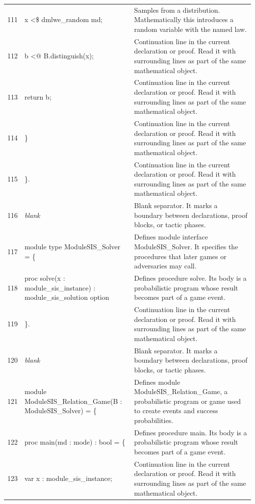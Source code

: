 \documentclass[10pt]{article}
\begin{document}
\begin{longtable}{r L{0.53\textwidth} L{0.37\textwidth}}
111 & {\ttfamily\scriptsize     x <\$ dmlwe\_random md;} & Samples from a distribution.  Mathematically this introduces a random variable with the named law. \\
112 & {\ttfamily\scriptsize     b <@ B.distinguish(x);} & Continuation line in the current declaration or proof.  Read it with surrounding lines as part of the same mathematical object. \\
113 & {\ttfamily\scriptsize     return b;} & Continuation line in the current declaration or proof.  Read it with surrounding lines as part of the same mathematical object. \\
114 & {\ttfamily\scriptsize   \}} & Continuation line in the current declaration or proof.  Read it with surrounding lines as part of the same mathematical object. \\
115 & {\ttfamily\scriptsize \}.} & Continuation line in the current declaration or proof.  Read it with surrounding lines as part of the same mathematical object. \\
116 & {\ttfamily\scriptsize \emph{blank}} & Blank separator.  It marks a boundary between declarations, proof blocks, or tactic phases. \\
117 & {\ttfamily\scriptsize module type ModuleSIS\_Solver = \{} & Defines module interface ModuleSIS\_Solver.  It specifies the procedures that later games or adversaries may call. \\
118 & {\ttfamily\scriptsize   proc solve(x : module\_sis\_instance) : module\_sis\_solution option} & Defines procedure solve.  Its body is a probabilistic program whose result becomes part of a game event. \\
119 & {\ttfamily\scriptsize \}.} & Continuation line in the current declaration or proof.  Read it with surrounding lines as part of the same mathematical object. \\
120 & {\ttfamily\scriptsize \emph{blank}} & Blank separator.  It marks a boundary between declarations, proof blocks, or tactic phases. \\
121 & {\ttfamily\scriptsize module ModuleSIS\_Relation\_Game(B : ModuleSIS\_Solver) = \{} & Defines module ModuleSIS\_Relation\_Game, a probabilistic program or game used to create events and success probabilities. \\
122 & {\ttfamily\scriptsize   proc main(md : mode) : bool = \{} & Defines procedure main.  Its body is a probabilistic program whose result becomes part of a game event. \\
123 & {\ttfamily\scriptsize     var x : module\_sis\_instance;} & Continuation line in the current declaration or proof.  Read it with surrounding lines as part of the same mathematical object. \\

\end{longtable}
\end{document}
